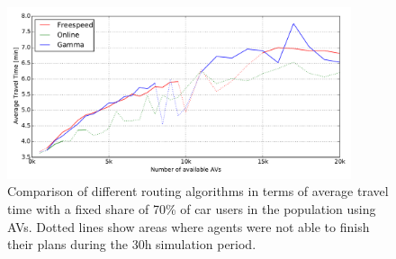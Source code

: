 \begin{figure}[h]
    \centering
    \includegraphics[width=0.9\textwidth]{figures/routing_constrained.pdf}
    \caption{Comparison of different routing algorithms in terms of average travel time with a fixed share of 70\% of car users in the population using AVs.
    Dotted lines show areas where agents were not able to finish their plans during the 30h simulation period.}
    \label{fig:routing_constrained}
\end{figure}
